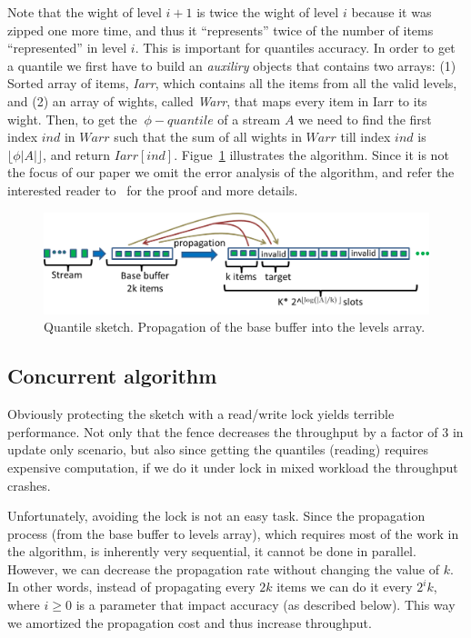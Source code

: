 Note that the wight of level $i+1$ is twice the wight of level
$i$ because it was zipped one more time, and thus it
``represents'' twice of the number of items ``represented'' in
level $i$.
This is important for quantiles accuracy.
In order to get a quantile we first have to build an
\emph{auxiliry} objects that contains two arrays:
(1) Sorted array of items, \emph{Iarr}, which 
contains all the items from all the valid levels, and (2) an
array of wights, called \emph{Warr}, that maps every item in
Iarr to its wight.
Then, to get the $~\phi - quantile$ of a stream $A$
we need to find the first index $ind$ in $Warr$ such that the
sum of all wights in $Warr$ till index $ind$ is $\lfloor \phi |A|
\rfloor$, and return $Iarr[ind]$.
Figue~\ref{fig:quantilesMerge} illustrates the algorithm.
Since it is not the focus of our paper we omit the error analysis
of the algorithm, and refer the interested reader to~\cite{} for
the proof and more details.

\begin{figure}[H]
    \centering
    \includegraphics[width=5in]{images/quantilesPropogation.png}
    \caption{Quantile sketch. Propagation of the base buffer
    into the levels array.}
    \label{fig:quantilesMerge}
\end{figure}






\subsection{Concurrent algorithm}

Obviously protecting the sketch with a read/write lock yields
terrible performance. 
Not only that the fence decreases the throughput by a factor of 3
in update only scenario, but also since getting the quantiles
(reading) requires expensive computation, if we do it under lock
in mixed workload the throughput crashes.

Unfortunately, avoiding the lock is not an easy task. 
Since the propagation process (from the base buffer to levels
array), which requires most of the work in the algorithm, is
inherently very sequential, it cannot be done in parallel.
However, we can decrease the propagation rate without changing
the value of $k$. 
In other words, instead of propagating every $2k$ items we can
do it every $2^{i}k$, where $i \geq 0$ is a parameter that
impact accuracy (as described below).
This way we amortized the propagation cost and thus increase
throughput.

